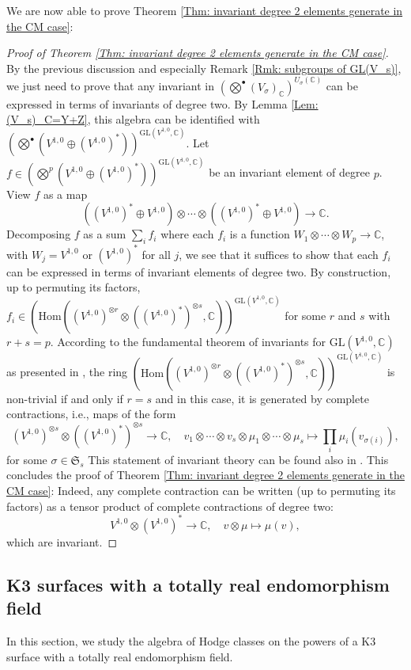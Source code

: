 \documentclass[11pt,twoside,a4paper]{amsart}
\newcommand{\0}{\mathscr{O}}
\newcommand{\C}{\mathbb{C}}
\newcommand{\s}{\sigma}
\theoremstyle{plain}
\theoremstyle{definition}
\theoremstyle{remark}
\begin{document}
We are now able to prove Theorem \ref{Thm: invariant degree 2 elements generate in the CM case}:
\begin{proof}[Proof of Theorem \ref{Thm: invariant degree 2 elements generate in the CM case}]
By the previous discussion and especially Remark \ref{Rmk: subgroups of GL(V_s)}, we just need to prove that any invariant in $(\bigotimes^{\bullet}(V_\s)_\C)^{U_\s(\C)}$ can be expressed in terms of invariants of degree two. By Lemma \ref{Lem: (V_s)_C=Y+Z}, this algebra can be identified with $(\bigotimes^{\bullet}(V^{1,0}\oplus
(V^{1,0})^*))^{\mathrm{GL}(V^{1,0},\C)}$.
Let $f\in \left(\bigotimes^p(V^{1,0}\oplus (V^{1,0})^*)\right)^{\mathrm{GL}(V^{1,0},\C)}$ be an invariant element of degree $p$. View $f$ as a map
\[((V^{1,0})^*\oplus V^{1,0})\otimes\cdots\otimes ((V^{1,0})^*\oplus V^{1,0})\rightarrow \C.\]
Decomposing $f$ as a sum $\sum_i f_i$ where each $f_i$ is a function $W_1\otimes\cdots\otimes W_p\rightarrow \C$, with $W_j=V^{1,0}$ or $(V^{1,0})^*$ for all $j$, we see that it suffices to show that each $f_i$ can be expressed in terms of invariant elements of degree two.
By construction, up to permuting its factors, $f_i\in\left(\mathrm{Hom}((V^{1,0})^{\otimes r}\otimes ((V^{1,0})^*)^{\otimes s},\C)\right)^{\mathrm{GL}(V^{1,0},\C)}$ for some $r$ and $s$ with $r+s=p$.
According to the fundamental theorem of invariants for $\mathrm{GL}(V^{1,0},\C)$ as presented in \cite[Thm.\ 4.2]{kraft1996classical}, the ring $\left(\mathrm{Hom}((V^{1,0})^{\otimes r}\otimes ((V^{1,0})^*)^{\otimes s},\C)\right)^{\mathrm{GL}(V^{1,0},\C)}$ is non-trivial if and only if $r=s$ and in this case, it is generated by complete contractions, i.e., maps of the form
\[(V^{1,0})^{\otimes s}
\otimes ((V^{1,0})^*)^{\otimes s}\rightarrow\C, \quad  v_1\otimes\cdots\otimes v_s\otimes \mu_1\otimes\cdots\otimes\mu_s \mapsto\textstyle\prod_i \mu_i(v_{\sigma(i)}),\]
for some $\sigma\in \mathfrak{S}_s$
This statement of invariant theory can be found also in \cite[Ch.\ III]{h.weyl2016classical}. 
This concludes the proof of Theorem \ref{Thm: invariant degree 2 elements generate in the CM case}: Indeed, any complete contraction can be written (up to permuting its factors) as a tensor product of complete contractions of degree two: \[V^{1,0}\otimes (V^{1,0})^*\rightarrow \C,\quad v\otimes \mu\mapsto \mu(v),\]
which are invariant.
\end{proof}


\subsection{K3 surfaces with a totally real endomorphism field}
In this section, we study the algebra of Hodge classes on the powers of a K3 surface with a totally real endomorphism field.
\end{document}
